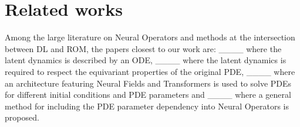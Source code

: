 \section{Related works}
Among the large literature on Neural Operators and methods at the intersection between DL and ROM, the papers closest to our work are: ____ where the latent dynamics is described by an ODE, ____ where the latent dynamics is required to respect the equivariant properties of the original PDE, ____ where an architecture featuring Neural Fields and Transformers is used to solve PDEs for different initial conditions and PDE parameters and ____ where a general method for including the PDE parameter dependency into Neural Operators is proposed.